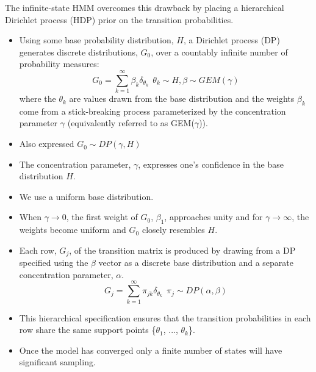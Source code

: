 \documentclass{article}
\begin{document}
  The infinite-state HMM overcomes this drawback by placing a hierarchical
  Dirichlet process (HDP) prior on the transition probabilities.
  \begin{itemize}
    \item Using some base probability distribution, $H$, a Dirichlet process 
    (DP) generates discrete distributions, $G_0$, over a countably infinite 
    number of probability measures:
    \begin{equation}
      G_0 = \sum_{k=1}^{\infty} \beta_k \delta_{\theta_k} ~~ \theta_k \sim H, \beta \sim GEM(\gamma)
    \end{equation}
    where the $\theta_k$ are values drawn from the base distribution and the
    weights $\beta_k$ come from a stick-breaking process parameterized by the  
    concentration parameter $\gamma$ (equivalently referred to as GEM($\gamma$)). 
    \item Also expressed $G_0 \sim DP(\gamma, H)$
    \item The concentration parameter, $\gamma$, expresses one's confidence in the 
    base distribution $H$.
    \item We use a uniform base distribution.
    \item When $\gamma\to 0$, the first weight of $G_0$, $\beta_1$, approaches 
    unity and for $\gamma\to\infty$, the weights become uniform and $G_0$ closely
    resembles $H$.
    \item Each row, $G_j$, of the transition matrix is produced by drawing from a DP specified 
    using the $\beta$ vector as a discrete base distribution and a separate concentration
    parameter, $\alpha$.
    \begin{equation}
      G_j = \sum_{k=1}^{\infty} \pi_{jk} \delta_{\theta_k} ~~ \pi_j \sim DP(\alpha, \beta)
    \end{equation}
    \item This hierarchical specification ensures that the transition probabilities in 
    each row share the same support points \{$\theta_1$, ..., $\theta_k$\}.
    \item Once the model has converged only a finite number of states will have significant
    sampling.
  \end{itemize}
  
\end{document}

